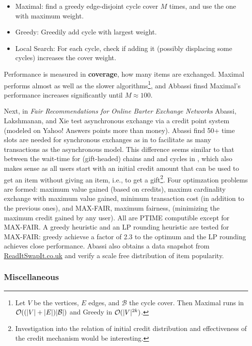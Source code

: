 \documentclass[main.tex]{subfiles}
\begin{document}
\begin{itemize}
  \item Maximal: find a greedy edge-disjoint cycle cover $M$ times, and use the one with maximum weight.
  \item Greedy: Greedily add cycle with largest weight.
  \item Local Search: For each cycle, check if adding it (possibly displacing some cycles) increases the cover weight.
\end{itemize}

Performance is measured in \textbf{coverage}, how many items are exchanged. Maximal performs almost as well as the slower algorithms\footnote{Let $V$ be the vertices, $E$ edges, and $\mathcal{B}$ the cycle cover. Then Maximal runs in $\mathcal{O}((|V| + |E|)|\mathcal{B}|)$ and Greedy  in $\mathcal{O}(|V|^{2k})$.}, and Abbassi finsd Maximal's performance increases significantly until $M \approx 100$.

Next, in \textit{Fair Recommendations for Online Barter Exchange Networks} Abassi, Lakshmanan, and Xie \cite{Abb2} test asynchronous exchange via a credit point system (modeled on Yahoo! Answers points more than money). Abassi find 50+ time slots are needed for synchronous exchanges as in \cite{Abb1} to facilitate as many transactions as the asynchronous model. This difference seems similar to that between the wait-time for (gift-headed) chains and and cycles in \cite{And1}, which also makes sense as all users start with an initial credit amount that can be used to get an item without giving an item, i.e., to get a gift\footnote{Investigation into the relation of initial credit distribution and effectiveness of the credit mechanism would be interesting.}. Four optimzation problems are formed: maximum value gained (based on credits), maximu cardinality exchange with maximum value gained, minimum transaction cost (in addition to the previous ones), and MAX-FAIR, maximum fairness, (minimizing the maximum credit gained by any user). All are PTIME computible except for MAX-FAIR. A greedy heuristic and an LP rounding heuristic are tested for MAX-FAIR: greedy achievse a factor of 2.3 to the optimum and the LP rounding achieves close performance. Abassi also obtains a data snapshot from \url{ReadItSwapIt.co.uk} and verify a scale free distribution of item popularity.

\subsubsection{Miscellaneous}
\end{document}
